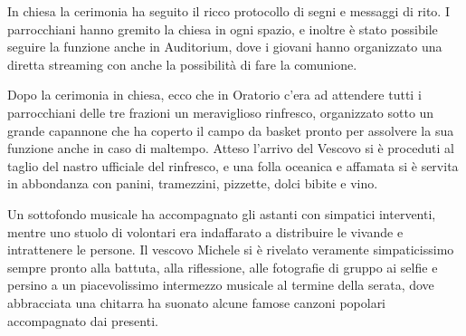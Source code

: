 In chiesa la cerimonia ha seguito il ricco protocollo di segni e messaggi di rito. I parrocchiani hanno gremito la chiesa in ogni spazio, e inoltre è stato possibile seguire la funzione anche in Auditorium, dove i giovani hanno organizzato una diretta streaming con anche la possibilità di fare la comunione.


Dopo la cerimonia in chiesa, ecco che in Oratorio c'era ad attendere tutti i parrocchiani delle tre frazioni un meraviglioso rinfresco, organizzato sotto un grande capannone che ha coperto il campo da basket pronto per assolvere la sua funzione anche in caso di maltempo.
Atteso l'arrivo del Vescovo si è proceduti al taglio del nastro ufficiale del rinfresco, e una folla oceanica e affamata si è servita in abbondanza con panini, tramezzini, pizzette, dolci bibite e vino.

Un sottofondo musicale ha accompagnato gli astanti con simpatici interventi, mentre uno stuolo di volontari era indaffarato a distribuire le vivande e intrattenere le persone. Il vescovo Michele si è rivelato veramente simpaticissimo sempre pronto alla battuta, alla riflessione, alle fotografie di gruppo ai selfie e persino a un piacevolissimo intermezzo musicale al termine della serata, dove abbracciata una chitarra ha suonato alcune famose canzoni popolari accompagnato dai presenti.



